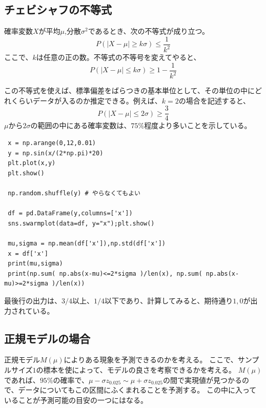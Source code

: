 \subsection{チェビシャフの不等式}
\begin{lemm}
 確率変数$X$が平均$\mu$,分散$\sigma^2$であるとき、次の不等式が成り立つ。
 \begin{equation*}
  P(|X-\mu| \geq k\sigma) \leq \frac{1}{k^2}
 \end{equation*}
ここで、$k$は任意の正の数。不等式の不等号を変えてやると、
 \begin{equation*}
  P(|X-\mu| \leq k\sigma) \geq 1-\frac{1}{k^2}
 \end{equation*}
\end{lemm}
この不等式を使えば、標準偏差をばらつきの基本単位として、その単位の中にどれくらいデータが入るのか推定できる。例えば、$k=2$の場合を記述すると、
 \begin{equation*}
  P(|X-\mu| \leq 2\sigma) \geq \frac{3}{4}
 \end{equation*}
$\mu$から$2\sigma$の範囲の中にある確率変数は、$75\%$程度より多いことを示している。
\begin{lstlisting}
 x = np.arange(0,12,0.01)
 y = np.sin(x/(2*np.pi)*20)
 plt.plot(x,y)
 plt.show()

 np.random.shuffle(y) # やらなくてもよい

 df = pd.DataFrame(y,columns=['x'])
 sns.swarmplot(data=df, y="x");plt.show()

 mu,sigma = np.mean(df['x']),np.std(df['x'])
 x = df['x']
 print(mu,sigma)
 print(np.sum( np.abs(x-mu)<=2*sigma )/len(x), np.sum( np.abs(x-mu)>=2*sigma )/len(x))
\end{lstlisting}
最後行の出力は、$3/4$以上、$1/4$以下であり、計算してみると、期待通り$1,0$が出力されている。

\subsection{正規モデルの場合}
正規モデル$M(\mu)$によりある現象を予測できるのかを考える。
ここで、サンプルサイズ$1$の標本を使によって、モデルの良さを考察できるかを考える。
$M(\mu)$であれば、$95\%$の確率で、$\mu-\sigma z_{0.025}\sim \mu+\sigma z_{0.025}$の間で実現値が見つかるので、データについてもこの区間にふくまれることを予測する。
この中に入っていることが予測可能の目安の一つにはなる。

